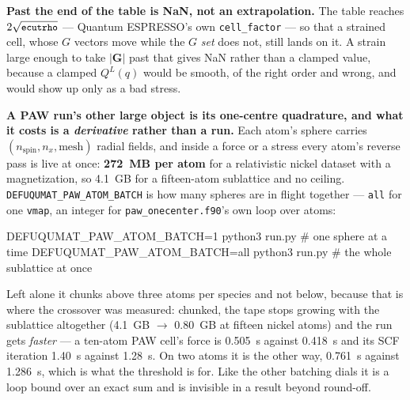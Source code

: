 \documentclass[11pt,a4paper]{article}
\newcommand{\qe}{Quantum ESPRESSO}
\newcommand{\code}[1]{\texttt{\small #1}}
\begin{document}
\begin{refuses}
\textbf{Past the end of the table is NaN, not an extrapolation.} The table
reaches $2\sqrt{\code{ecutrho}}$ --- \qe's own \code{cell\_factor} --- so that a
strained cell, whose $G$ vectors move while the $G$ \emph{set} does not, still
lands on it. A strain large enough to take $|\mathbf{G}|$ past that gives NaN
rather than a clamped value, because a clamped $Q^L(q)$ would be smooth, of the
right order and wrong, and would show up only as a bad stress.
\end{refuses}

\textbf{A PAW run's other large object is its one-centre quadrature, and what
it costs is a \emph{derivative} rather than a run.} Each atom's sphere carries
$(n_{\mathrm{spin}}, n_x, \text{mesh})$ radial fields, and inside a force or a
stress every atom's reverse pass is live at once: \textbf{272~MB per atom} for a
relativistic nickel dataset with a magnetization, so 4.1~GB for a fifteen-atom
sublattice and no ceiling. \code{DEFUQUMAT\_PAW\_ATOM\_BATCH} is how many spheres
are in flight together --- \code{all} for one \code{vmap}, an integer for
\code{paw\_onecenter.f90}'s own loop over atoms:

\begin{shcode}
DEFUQUMAT_PAW_ATOM_BATCH=1   python3 run.py   # one sphere at a time
DEFUQUMAT_PAW_ATOM_BATCH=all python3 run.py   # the whole sublattice at once
\end{shcode}

Left alone it chunks above three atoms per species and not below, because that
is where the crossover was measured: chunked, the tape stops growing with the
sublattice altogether (4.1~GB $\to$ 0.80~GB at fifteen nickel atoms) and the run
gets \emph{faster} --- a ten-atom PAW cell's force is 0.505~s against 0.418~s
and its SCF iteration 1.40~s against 1.28~s. On two atoms it is the other way,
0.761~s against 1.286~s, which is what the threshold is for. Like the other
batching dials it is a loop bound over an exact sum and is invisible in a result
beyond round-off.
\end{document}
